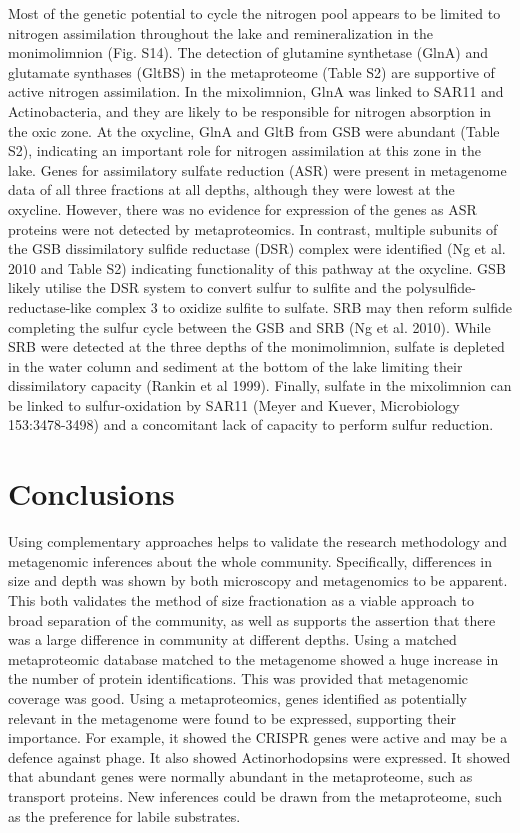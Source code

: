 Most of the genetic potential to cycle the nitrogen pool appears to be limited to nitrogen assimilation throughout the lake and remineralization in the monimolimnion (Fig. S14). The detection of glutamine synthetase (GlnA) and glutamate synthases (GltBS) in the metaproteome (Table S2) are supportive of active nitrogen assimilation. In the mixolimnion, GlnA was linked to SAR11 and Actinobacteria, and they are likely to be responsible for nitrogen absorption in the oxic zone. At the oxycline, GlnA and GltB from GSB were abundant (Table S2), indicating an important role for nitrogen assimilation at this zone in the lake.
Genes for assimilatory sulfate reduction (ASR) were present in metagenome data of all three fractions at all depths, although they were lowest at the oxycline. However, there was no evidence for expression of the genes as ASR proteins were not detected by metaproteomics. In contrast, multiple subunits of the GSB dissimilatory sulfide reductase (DSR) complex were identified (Ng et al. 2010 and Table S2) indicating functionality of this pathway at the oxycline. GSB likely utilise the DSR system to convert sulfur to sulfite and the polysulfide-reductase-like complex 3 to oxidize sulfite to sulfate. SRB may then reform sulfide completing the sulfur cycle between the GSB and SRB (Ng et al. 2010). While SRB were detected at the three depths of the monimolimnion, sulfate is depleted in the water column and sediment at the bottom of the lake limiting their dissimilatory capacity (Rankin et al 1999). Finally, sulfate in the mixolimnion can be linked to sulfur-oxidation by SAR11 (Meyer and Kuever, Microbiology 153:3478-3498) and a concomitant lack of capacity to perform sulfur reduction. 


\section{Conclusions}
Using complementary approaches helps to validate the research methodology and 
metagenomic inferences about the whole community.
Specifically, differences in size and depth was shown by both microscopy and metagenomics to be apparent.
This both validates the method of size fractionation as a viable approach to broad separation of the community,
as well as supports the assertion that there was a large difference in community at different depths.
Using a matched metaproteomic database matched to the metagenome showed a huge increase in the number of protein identifications.
This was provided that metagenomic coverage was good.
Using a metaproteomics, genes identified as potentially relevant in the metagenome were found to be expressed, supporting their importance.
For example, it showed the CRISPR genes were active and may be a defence against phage.
It also showed Actinorhodopsins were expressed.
It showed that abundant genes were normally abundant in the metaproteome, such as transport proteins.
New inferences could be drawn from the metaproteome, such as the preference for labile substrates.



